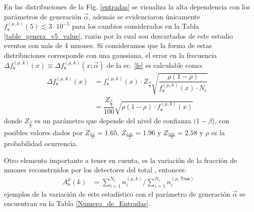 En las distribuciones de la Fig. \ref{entradas} se visualiza la alta dependencia con los parámetros de generación $\vec{\alpha}$, además se evidenciaron únicamente $f^{(\mu, k)}_\textsf{e}(5)\lesssim 3\cdot 10^{-5}$ para los cambios considerados en la Tabla  \ref{table_genera_v5_value}, razón por la cual son descartados de este estudio eventos con más de 4 muones. Si consideramos que la forma de estas distribuciones corresponde con una gaussiana, el error en la frecuencia $\Delta f^{(\mu, k)}_\textsf{e} (x) \equiv \Delta f^{(\mu, k)}_\textsf{e} (x;\vec{\alpha})$ de la ec. \ref{fe} es calculable como:
\begin{eqnarray}\label{error0}
\Delta f^{(\mu, k)}_\textsf{e} (x) & = f^{(\mu, k)}_\textsf{e} (x) \cdot Z_{\frac{\beta}{2}} \sqrt{\dfrac{\rho(1-\rho)}{f^{(\mu, k)}_\textsf{e} (x)\cdot N_e}} \\
& = \dfrac{Z_{\frac{\beta}{2}}}{100} \sqrt{\rho(1-\rho)\cdot f^{(\mu, k)}_\textsf{e} (x)} ~~~~~~~~~~~
\end{eqnarray}%
donde $Z_{\frac{\beta}{2}}$ es un parámetro que depende del nivel de confianza $(1-\beta$), con posibles valores dados por $Z_{\frac{0.1}{2}}=1.65$, $Z_{\frac{0.05}{2}}=1.96$ y $Z_{\frac{0.01}{2}}=2.58$ y $\rho$ es la probabilidad ocurrencia.

Otro elemento importante a tener en cuenta, es la variación de la fracción de muones reconstruidos por los detectores del total \MC, entonces:
\begin{eqnarray}\label{Ak}
A_\textsf{n}^\mu(k) & = {\sum\limits_{i=1}^{N_e} n_i^{(\mu,k)}}/{\sum\limits_{i=1}^{N_e} n_i^{(\mu,\textsf{True})}}
\end{eqnarray}
ejemplos de la variación de este estadístico con el parámetro de generación $\vec{\alpha}$ se encuentran en la Tabla \ref{Numero_de_Entradas}.



